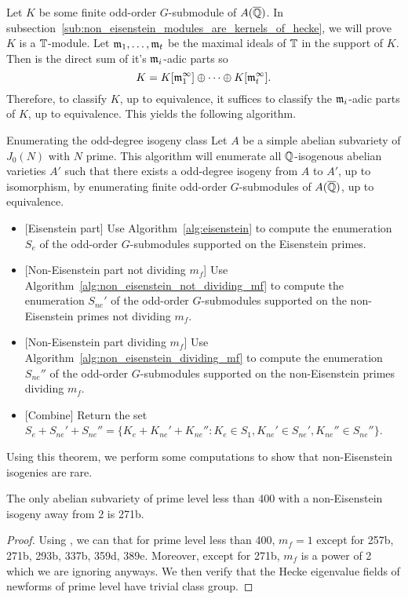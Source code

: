\documentclass{article}
\begin{document}
Let $K$ be some finite odd-order $G$-submodule of $A(\overline{\mathbb{Q}})$. In
subsection~\ref{sub:non_eisenstein_modules_are_kernels_of_hecke}, we will
prove $K$ is a $\mathbb{T}$-module. Let $\mathfrak{m}_1,\ldots,\mathfrak{m}_t$ be the maximal ideals of
$\mathbb{T}$ in the support of $K$. Then is the direct sum of it's $\mathfrak{m}_i$-adic parts
so
\[
    K = K[\mathfrak{m}_1 ^\infty] \oplus \cdots \oplus K[\mathfrak{m}_t ^\infty].
\]
Therefore, to classify $K$, up to equivalence, it suffices to classify the
$\mathfrak{m}_i$-adic parts of $K$, up to equivalence. This yields the following
algorithm.
\begin{algorithm}{Enumerating the odd-degree isogeny class}
    Let $A$ be a simple abelian subvariety of $J_0(N)$ with $N$ prime. This
    algorithm will enumerate all $\mathbb{Q}$-isogenous abelian varieties $A'$ such
    that there exists a odd-degree isogeny from $A$ to $A'$, up to isomorphism,
    by enumerating finite odd-order $G$-submodules of $A(\overline{\mathbb{Q}})$, up to
    equivalence.
    \begin{itemize}
        \item{} [Eisenstein part]
            Use Algorithm~\ref{alg:eisenstein} to compute the enumeration
            $S_e$ of the odd-order $G$-submodules supported on the Eisenstein
            primes.
        \item{} [Non-Eisenstein part not dividing $m_f$]
            Use Algorithm~\ref{alg:non_eisenstein_not_dividing_mf} to compute the
            enumeration $S_{ne} '$ of the odd-order $G$-submodules supported on
            the non-Eisenstein primes not dividing $m_f$.
        \item{} [Non-Eisenstein part dividing $m_f$]
            Use Algorithm~\ref{alg:non_eisenstein_dividing_mf} to compute the
            enumeration $S_{ne} ''$ of the odd-order $G$-submodules supported on
            the non-Eisenstein primes dividing $m_f$.
        \item{} [Combine]
            Return the set $S_e+ S_{ne} ' + S_{ne} ''=\{K_e + K_{ne}' + K_{ne}
            '': K_e\in S_1, K_{ne}'\in S_{ne}', K_{ne} '' \in S_{ne}''\}$.
    \end{itemize}
\end{algorithm}


Using this theorem, we perform some computations to show that non-Eisenstein
isogenies are rare.
\begin{proposition}
    The only abelian subvariety of prime level less than 400 with a
    non-Eisenstein isogeny away from 2 is 271b.
\end{proposition}
\begin{proof}
    Using \sage, we can that for prime level less than 400, $m_f=1$ except for
    257b, 271b, 293b, 337b, 359d, 389e. Moreover, except for 271b, $m_f$ is a
    power of 2 which we are ignoring anyways. We then verify that the Hecke
    eigenvalue fields of newforms of prime level have trivial class group.
\end{proof}
\end{document}

